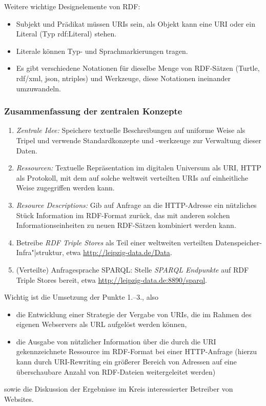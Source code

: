 \documentclass[a4paper,11pt]{article}
\begin{document}
Weitere wichtige Designelemente von RDF:
\begin{itemize}
\item Subjekt und Prädikat müssen URIs sein, als Objekt kann eine URI oder ein
  Literal (Typ rdf:Literal) stehen.
\item Literale können Typ- und Sprachmarkierungen tragen.
\item Es gibt verschiedene Notationen für dieselbe Menge von RDF-Sätzen
  (Turtle, rdf/xml, json, ntriples) und Werkzeuge, diese Notationen ineinander
  umzuwandeln.
\end{itemize}
\subsubsection*{Zusammenfassung der zentralen Konzepte}
\begin{enumerate}
\item \emph{Zentrale Idee:} Speichere textuelle Beschreibungen auf uniforme
  Weise als Tripel und verwende Standardkonzepte und -werkzeuge zur Verwaltung
  dieser Daten.
\item \emph{Ressourcen:} Textuelle Repräsentation im digitalen Universum als
  URI, HTTP als Protokoll, mit dem auf solche weltweit verteilten URIs auf
  einheitliche Weise zugegriffen werden kann.
\item \emph{Resource Descriptions:} Gib auf Anfrage an die HTTP-Adresse ein
  nützliches Stück Information im RDF-Format zurück, das mit anderen solchen
  Informationseinheiten zu neuen RDF-Sätzen kombiniert werden kann.
\item Betreibe \emph{RDF Triple Stores} als Teil einer weltweiten verteilten
  Datenspeicher-Infra"|struktur, etwa \url{http://leipzig-data.de/Data}.  
\item (Verteilte) Anfragesprache SPARQL: Stelle \emph{SPARQL Endpunkte} auf RDF
  Triple Stores bereit, etwa \url{http://leipzig-data.de:8890/sparql}.
\end{enumerate}
Wichtig ist die Umsetzung der Punkte 1.--3., also  
\begin{itemize}
\item die Entwicklung einer Strategie der Vergabe von URIs, die im Rahmen des
  eigenen Webservers als URL aufgelöst werden können,
\item die Ausgabe von nützlicher Information über die durch die URI
  gekennzeichnete Ressource im RDF-Format bei einer HTTP-Anfrage (hierzu kann
  durch URI-Rewriting ein größerer Bereich von Adressen auf eine überschaubare
  Anzahl von RDF-Dateien weitergeleitet werden) 
\end{itemize}
sowie die Diskussion der Ergebnisse im Kreis interessierter Betreiber von
Websites. 
\end{document}
